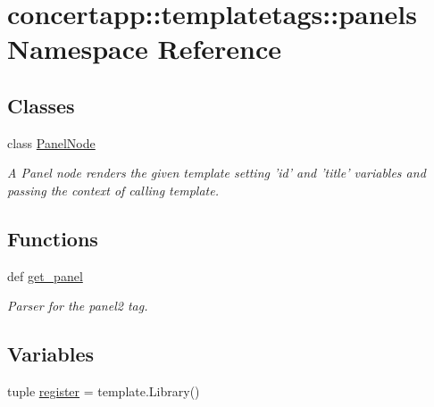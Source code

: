 \hypertarget{namespaceconcertapp_1_1templatetags_1_1panels}{
\section{concertapp::templatetags::panels Namespace Reference}
\label{namespaceconcertapp_1_1templatetags_1_1panels}
}
\subsection*{Classes}
\begin{DoxyCompactItemize}
\item 
class \hyperlink{classconcertapp_1_1templatetags_1_1panels_1_1_panel_node}{PanelNode}
\begin{DoxyCompactList}\small\item\em A Panel node renders the given template setting 'id' and 'title' variables and passing the context of calling template. \item\end{DoxyCompactList}\end{DoxyCompactItemize}
\subsection*{Functions}
\begin{DoxyCompactItemize}
\item 
def \hyperlink{namespaceconcertapp_1_1templatetags_1_1panels_a1579a8626c3abbe3642d0283f31515ec}{get\_\-panel}
\begin{DoxyCompactList}\small\item\em Parser for the panel2 tag. \item\end{DoxyCompactList}\end{DoxyCompactItemize}
\subsection*{Variables}
\begin{DoxyCompactItemize}
\item 
tuple \hyperlink{namespaceconcertapp_1_1templatetags_1_1panels_ab4ce275c75d29091b9e508a98f21f3e2}{register} = template.Library()
\end{DoxyCompactItemize}


